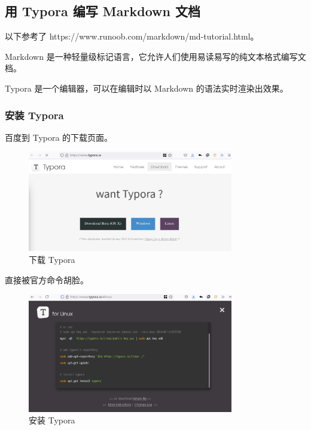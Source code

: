 \documentclass[UTF-8]{ctexart}
\begin{document}
			
		\subsection{用 Typora 编写 Markdown 文档}
		
			以下参考了 https://www.runoob.com/markdown/md-tutorial.html。
				
			Markdown 是一种轻量级标记语言，它允许人们使用易读易写的纯文本格式编写文档。
			
			Typora 是一个编辑器，可以在编辑时以 Markdown 的语法实时渲染出效果。
				
			\subsubsection{安装 Typora}
			
				百度到 Typora 的下载页面。
				
				\begin{figure}[H]
					\centering
					\includegraphics[width=0.8\textwidth]{fig/typora_download.png}
					\caption*{下载 Typora}
				\end{figure}
			
				直接被官方命令胡脸。
			
				\begin{figure}[H]
					\centering
					\includegraphics[width=0.8\textwidth]{fig/typora_install.png}
					\caption*{安装 Typora}
				\end{figure}
			
\end{document}
